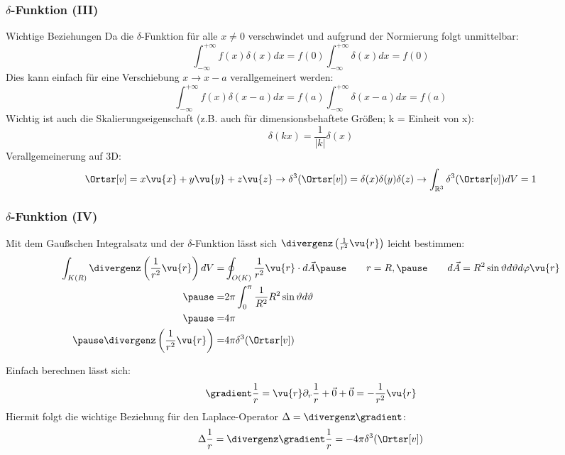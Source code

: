 \begin{frame}
  \frametitle{$\delta$-Funktion (III)}
  \begin{block}{Wichtige Beziehungen}
\pause Da die $\delta$-Funktion für alle $x\neq 0$ verschwindet und aufgrund
der Normierung folgt unmittelbar:
$$
\int_{-\infty}^{+\infty} f(x) \delta(x) dx = f(0) \int_{-\infty}^{+\infty}
 \delta(x) dx =  f(0)
 $$\pause
 Dies kann einfach für eine Verschiebung $x\to x-a$ verallgemeinert
 werden:
 $$
\int_{-\infty}^{+\infty} f(x) \delta(x-a) dx = f(a) \int_{-\infty}^{+\infty}
 \delta(x-a) dx =  f(a)
 $$\pause
 Wichtig ist auch die Skalierungseigenschaft (z.B. auch für
 dimensionsbehaftete Größen; k = Einheit von x):
 $$
\delta(kx)  = \frac{1}{|k|}\delta(x)
$$\pause
Verallgemeinerung auf 3D:
$$
\Ortsr[v] = x\vu{x} +y\vu{y}+z\vu{z} \to
\delta^3(\Ortsr[v])=\delta(x) \delta(y) \delta(z) \to
\int_{\mathbb{R}^3} \delta^3(\Ortsr[v]) dV = 1 
$$
 
 

\end{block}
\end{frame}
\begin{frame}
  \frametitle{$\delta$-Funktion (IV)}
Mit dem Gaußschen Integralsatz und der $\delta$-Funktion lässt sich
$\divergenz\left(\frac{1}{r^2}\vu{r}\right)$ leicht bestimmen:
\begin{align*}
  \int_{K(R)} \divergenz\left(\frac{1}{r^2}\vu{r}\right) dV = &
 \oint_{O(K)} \frac{1}{r^2}\vu{r}\cdot d\vec{A}\pause \qquad r=R,\pause \qquad d\vec{A} =R^2 \sin\vartheta d\vartheta d\varphi \vu{r}\\
  \pause
  = & 2\pi \int_0^\pi \frac{1}{R^2} R^2 \sin\vartheta d\vartheta \\
  \pause
  = & 4\pi \\
  \pause
  \divergenz\left(\frac{1}{r^2}\vu{r}\right)  =& 4\pi\delta^3(\Ortsr[v])
\end{align*}\pause

Einfach berechnen lässt sich:
$$
\gradient \frac{1}{r} = \vu{r} \partial_r \frac{1}{r} + \vec{0} + \vec{0} =-\frac{1}{r^2} \vu{r}
$$\pause
Hiermit folgt die wichtige Beziehung für den \alert{Laplace-Operator}
$\Delta = \divergenz\gradient$:
$$
\Delta \frac{1}{r} = \divergenz\gradient \frac{1}{r} = -4\pi\delta^3(\Ortsr[v]) 
$$
\end{frame}
